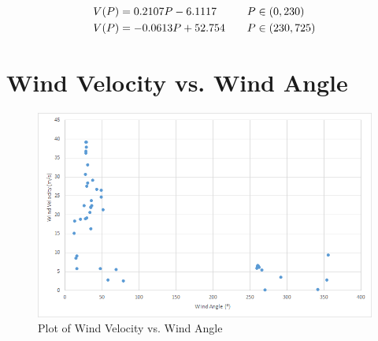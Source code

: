 \documentclass{article}
\begin{document}
\begin{align*}
\centering
    V(P) &= 0.2107P - 6.1117&& \text{\quad $P\in(0,230)$} \\
    V(P) &= -0.0613P + 52.754 && \text{\quad $P\in(230,725)$} \\
\end{align*}



\part{Wind Velocity vs. Wind Angle}
\label{alan}

\begin{figure}[H]
  \centering
  \includegraphics[width=\textwidth]{alan-data.png}
  \caption{Plot of Wind Velocity vs. Wind Angle}
\end{figure}
\end{document}
